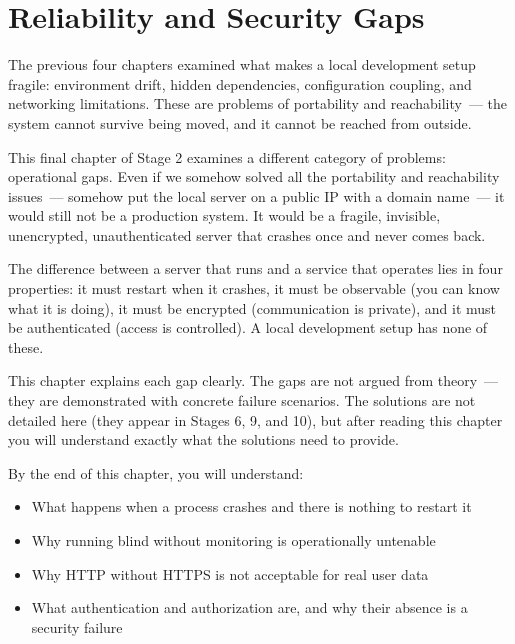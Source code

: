 \setcounter{chapter}{10}
\chapter{Reliability and Security Gaps}\label{ch:11-reliability-security-gaps}

\chapterrule

The previous four chapters examined what makes a local development setup fragile: environment drift, hidden dependencies, configuration coupling, and networking limitations. These are problems of portability and reachability~--- the system cannot survive being moved, and it cannot be reached from outside.

This final chapter of Stage 2 examines a different category of problems: operational gaps. Even if we somehow solved all the portability and reachability issues~--- somehow put the local server on a public IP with a domain name~--- it would still not be a production system. It would be a fragile, invisible, unencrypted, unauthenticated server that crashes once and never comes back.

The difference between a server that runs and a service that operates lies in four properties: it must restart when it crashes, it must be observable (you can know what it is doing), it must be encrypted (communication is private), and it must be authenticated (access is controlled). A local development setup has none of these.

This chapter explains each gap clearly. The gaps are not argued from theory~--- they are demonstrated with concrete failure scenarios. The solutions are not detailed here (they appear in Stages 6, 9, and 10), but after reading this chapter you will understand exactly what the solutions need to provide.

\begin{objectives}

By the end of this chapter, you will understand:

\begin{itemize}
\tightlist
\item
  What happens when a process crashes and there is nothing to restart it
\item
  Why running blind without monitoring is operationally untenable
\item
  Why HTTP without HTTPS is not acceptable for real user data
\item
  What authentication and authorization are, and why their absence is a security failure
\end{itemize}

\end{objectives}

